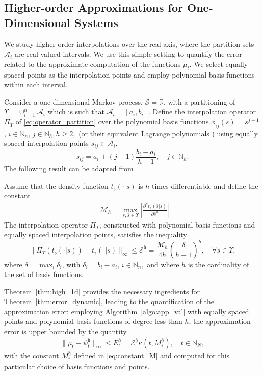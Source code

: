 \documentclass{LMCS}
\begin{document}
\subsection{Higher-order Approximations for One-Dimensional Systems}

We study higher-order interpolations over the real axis, 
where the partition sets $\mathcal A_i$ are real-valued intervals. 
We use this simple setting to quantify the error related to the approximate computation of the functions $\mu_t$.
We select equally spaced points as the interpolation points and employ polynomial basis functions within each interval.

Consider a one dimensional Markov process, $\mathcal S = \mathbb R$, with a partitioning of $\Upsilon = \cup_{i=1}^{n}\mathcal A_i$ which is such that $\mathcal A_i = [a_i,b_i]$. 
Define the interpolation operator $\Pi_\Upsilon$ of \eqref{eq:operator_partition} over the polynomial basis functions $\phi_{ij}(s) = s^{j-1}$, $i\in\mathbb N_n,\,j\in\mathbb N_h,h\ge 2,$ (or their equivalent Lagrange polynomials \cite{Mastroianni:2008:IPB:1502750})
using equally spaced interpolation points $s_{ij}\in \mathcal A_i,$
\begin{equation*}
s_{ij} = a_i+(j-1)\frac{b_i-a_i}{h-1},\quad j\in\mathbb N_h. 
\end{equation*}
The following result can be adapted from \cite{Mastroianni:2008:IPB:1502750}. 
\begin{thm}
\label{thm:high_1d}
Assume that the density function $t_{\mathfrak s}(\cdot|s)$ is $h$-times differentiable and define the constant 
\begin{align*}
&\mathcal M_h = \max_{s,\bar s\in\Upsilon} \left|\frac{\partial^h t_{\mathfrak s}(\bar s|s)}{\partial \bar s^h}\right|.
\end{align*}
The interpolation operator $\Pi_\Upsilon$, constructed with polynomial basis functions and equally spaced interpolation points, satisfies the inequality
\begin{equation*}
\|\Pi_{\Upsilon}\left(t_{\mathfrak s}(\cdot|s)\right)-t_{\mathfrak s}(\cdot|s)\|_{\infty} \le \mathcal E^{\mathfrak h} = \frac{\mathcal M_h}{4h}\left(\frac{\delta}{h-1}\right)^h,\quad \forall s\in\Upsilon,
\end{equation*}
where $\delta = \max_i \delta_i$, 
with $\delta_i = b_i-a_i,\,i\in\mathbb N_n,$
and where $h$ is the cardinality of the set of basis functions.
\end{thm}
Theorem~\ref{thm:high_1d} provides the necessary ingredients for Theorem~\ref{thm:error_dynamic}, 
leading to the quantification of the approximation error: 
employing Algorithm~\ref{algo:app_val} with equally spaced points and
polynomial basis functions of degree less than $h$,
the approximation error is upper bounded by the quantity
\begin{equation*}
\|\mu_t-\psi_t^{\mathfrak h}\|_\infty\le E_t^{\mathfrak h} = \mathcal E^{\mathfrak h}\kappa(t,M_{\mathfrak f}^{\mathfrak h}),\quad t\in\mathbb N_N,
\end{equation*}
with the constant $M_{\mathfrak f}^{\mathfrak h}$ defined in \eqref{eq:constant_M} and computed for this particular choice of basis functions and points.
\end{document}
